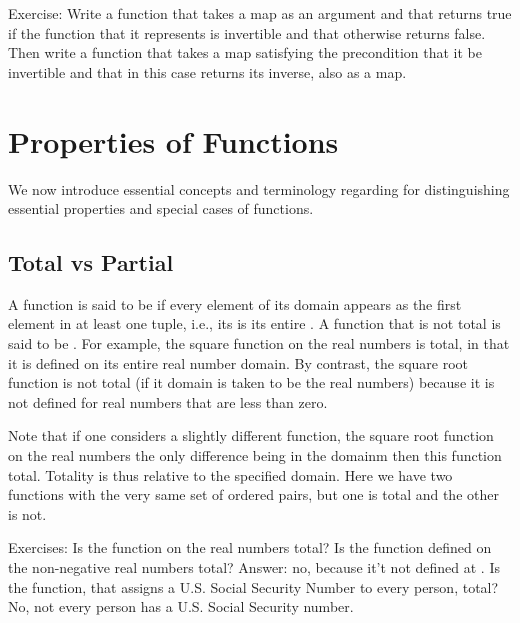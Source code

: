 \documentclass[letterpaper,10pt,english]{sphinxmanual}
\begin{document}
Exercise: Write a function that takes a map as an argument and that
returns true if the function that it represents is invertible and that
otherwise returns false. Then write a function that takes a map
satisfying the precondition that it be invertible and that in this
case returns its inverse, also as a map.


\section{Properties of Functions}
\label{\detokenize{08-relations:properties-of-functions}}
We now introduce essential concepts and terminology regarding for
distinguishing essential properties and special cases of functions.


\subsection{Total vs Partial}
\label{\detokenize{08-relations:total-vs-partial}}
A function is said to be  if every element of its domain
appears as the first element in at least one tuple, i.e., its
 is its entire .  A function that is not total is
said to be . For example, the square function on the real
numbers is total, in that it is defined on its entire real number
domain. By contrast, the square root function is not total (if it
domain is taken to be the real numbers) because it is not defined for
real numbers that are less than zero.

Note that if one considers a slightly different function, the square
root function on the  real numbers the only difference
being in the domainm then this function  total. Totality is thus
relative to the specified domain. Here we have two functions with the
very same set of ordered pairs, but one is total and the other is not.

Exercises: Is the function  on the real numbers total?  Is the
 function defined on the non-negative real numbers total? Answer:
no, because it’t not defined at .  Is the  function, that
assigns a U.S. Social Security Number to every person, total? No, not
every person has a U.S. Social Security number.
\end{document}
